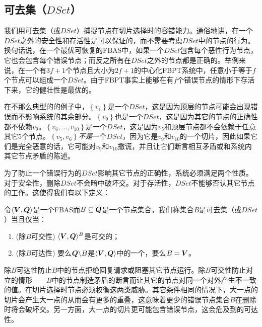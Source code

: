 \subsection{可去集（$DSet$）}
我们用可去集（或$DSet$）捕捉节点在切片选择时的容错能力。通俗地讲，在一个$DSet$之外的安全性和存活性是可以保证的，而不需要考虑$DSet$中的节点的行为。换句话说，在一个最优可恢复的FBAS中，如果一个$DSet$包含每个恶性行为节点，它也会包含每个错误节点；而反之所有在$DSet$之外的节点都是正确的。举例来说，在一个有$3f+1$个节点且{\quorum}大小为$2f+1$的中心化FBPT系统中，任意小于等于$f$个节点可以组成一个$DSet$。由于FBPT事实上能够在有$f$个错误节点的情形下存活下来，它的健壮性是最优的。

在不那么典型的的例子中，$\left\{v_1\right\}$是一个$DSet$，这是因为顶层的节点可能会出现错误而不影响系统的其余部分。$\left\{v_9\right\}$也是一个$DSet$，这是因为其它的节点的正确性都不依赖$v_9$。$\left\{v_6,\ldots,v_{10}\right\}$是一个$DSet$，这是因为$v_5$和顶层节点都不会依赖于任意其它5个节点。$\left\{v_5,v_6\right\}$\textit{不是}一个$DSet$，因为它是$v_9$和$v_{10}$的一个切片，因此如果它们是完全恶意的话，它可能对$v_9$和$v_{10}$撒谎，并且让它们断言相互矛盾或和系统内其它节点矛盾的陈述。

为了防止一个错误行为的$DSet$影响其它节点的正确性，系统必须满足两个性质。对于安全性，删除$DSet$不会暗中破坏{\quorum}交。对于存活性，$DSet$不能够否认其它节点的工作{\quorum}。这使得我们有以下定义：

\begin{definition}[DSet]
        令$\langle{\bm V},{\bm Q}\rangle$是一个FBAS而$B\subseteq {\bm Q}$是一个节点集合，我们称集合$B$是可去集（或$DSet$）当且仅当：
        \begin{enumerate}
                \item (除$B${\quorum}可交性) $\langle{\bm V},{\bm Q}\rangle^{B}$是{\quorum}可交的；
                \item (除$B${\quorum}可达性) 要么${\bm Q}\backslash B$是$\langle{\bm V},{\bm Q}\rangle$中的一个{\quorum}，要么$B={\bm V}$。
        \end{enumerate}
\end{definition}

除$B${\quorum}可达性防止$B$中的节点拒绝回复请求或阻塞其它节点运行。除$B${\quorum}可交性防止对立的情形——$B$中的节点制造矛盾的断言而让其它的节点对同一个{\slot}对外产生不一致的值。在切片选择时节点必须权衡这两类威胁。其它条件相同的情况下，大一点的切片会产生大一点的{\quorum}从而会有更多的重叠，这意味着更少的错误节点集合$B$在删除时将会破坏{\quorum}交。另一方面，大一点的切片更可能包含错误节点，这会危及到{\quorum}的可达性。

